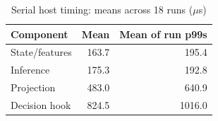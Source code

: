 \begin{table}[t]
\caption{Serial host timing: means across 18 runs ($\mu$s)}
\label{tab:timing}
\centering\footnotesize
\setlength{\tabcolsep}{3pt}
\begin{tabular}{lrr}
\toprule
Component & Mean & Mean of run p99s \\
\midrule
State/features & 163.7 & 195.4 \\
Inference & 175.3 & 192.8 \\
Projection & 483.0 & 640.9 \\
Decision hook & 824.5 & 1016.0 \\
\bottomrule
\end{tabular}
\end{table}
